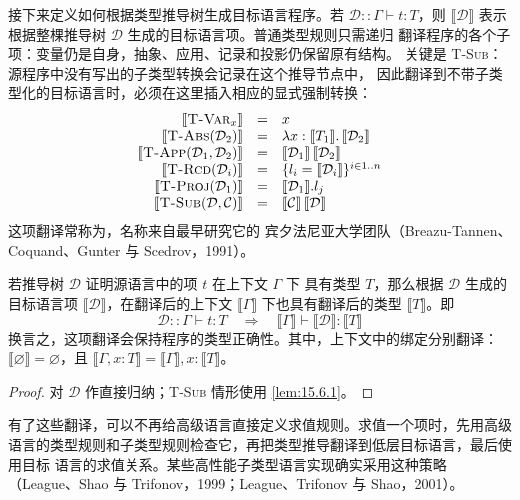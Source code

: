 接下来定义如何根据类型推导树生成目标语言程序。若
\(\mathcal D::\Gamma\vdash t:T\)，则 \(\llbracket\mathcal D\rrbracket\)
表示根据整棵推导树 \(\mathcal D\) 生成的目标语言项。普通类型规则只需递归
翻译程序的各个子项：变量仍是自身，抽象、应用、记录和投影仍保留原有结构。
关键是 \textsc{T-Sub}：源程序中没有写出的子类型转换会记录在这个推导节点中，
因此翻译到不带子类型化的目标语言时，必须在这里插入相应的显式强制转换：
\[
\begin{array}{rcl}
\llbracket\textsc{T-Var}_x\rrbracket&=&x\\
\llbracket\textsc{T-Abs}(\mathcal D_2)\rrbracket
 &=&\lambda x:\llbracket T_1\rrbracket.\,\llbracket\mathcal D_2\rrbracket\\
\llbracket\textsc{T-App}(\mathcal D_1,\mathcal D_2)\rrbracket
 &=&\llbracket\mathcal D_1\rrbracket\,\llbracket\mathcal D_2\rrbracket\\
\llbracket\textsc{T-Rcd}(\mathcal D_i)\rrbracket
 &=&\{l_i=\llbracket\mathcal D_i\rrbracket\}^{i\in1..n}\\
\llbracket\textsc{T-Proj}(\mathcal D_1)\rrbracket
 &=&\llbracket\mathcal D_1\rrbracket.l_j\\
\llbracket\textsc{T-Sub}(\mathcal D,\mathcal C)\rrbracket
 &=&\llbracket\mathcal C\rrbracket\,\llbracket\mathcal D\rrbracket
\end{array}
\]
这项翻译常称为，名称来自最早研究它的
宾夕法尼亚大学团队（Breazu-Tannen、Coquand、Gunter 与 Scedrov，1991）。

\begin{theorem}
\label{thm:15.6.2}
若推导树 \(\mathcal D\) 证明源语言中的项 \(t\) 在上下文 \(\Gamma\) 下
具有类型 \(T\)，那么根据 \(\mathcal D\) 生成的目标语言项
\(\llbracket\mathcal D\rrbracket\)，在翻译后的上下文
\(\llbracket\Gamma\rrbracket\) 下也具有翻译后的类型
\(\llbracket T\rrbracket\)。即
\[
\mathcal D::\Gamma\vdash t:T
\quad\Longrightarrow\quad
\llbracket\Gamma\rrbracket\vdash
\llbracket\mathcal D\rrbracket:\llbracket T\rrbracket
\]
换言之，这项翻译会保持程序的类型正确性。其中，上下文中的绑定分别翻译：
\(\llbracket\varnothing\rrbracket=\varnothing\)，且
\(\llbracket\Gamma,x:T\rrbracket=
\llbracket\Gamma\rrbracket,x:\llbracket T\rrbracket\)。
\end{theorem}
\begin{proof}
对 \(\mathcal D\) 作直接归纳；\textsc{T-Sub} 情形使用
\cref{lem:15.6.1}。
\end{proof}

有了这些翻译，可以不再给高级语言直接定义求值规则。求值一个项时，先用高级
语言的类型规则和子类型规则检查它，再把类型推导翻译到低层目标语言，最后使用目标
语言的求值关系。某些高性能子类型语言实现确实采用这种策略（League、Shao 与
Trifonov，1999；League、Trifonov 与 Shao，2001）。


